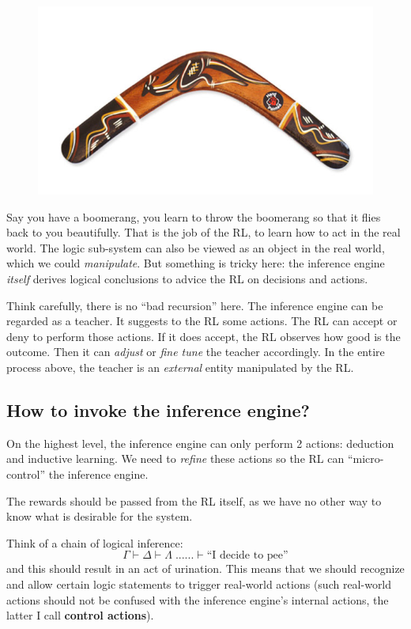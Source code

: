 \documentclass[12pt]{article}
\begin{document}
\begin{figure}[H]
\centering
\includegraphics[scale=0.25]{boomerang.jpg}
\end{figure}

Say you have a boomerang, you learn to throw the boomerang so that it flies back to you beautifully.  That is the job of the RL, to learn how to act in the real world.  The logic sub-system can also be viewed as an object in the real world, which we could \textit{manipulate}.  But something is tricky here: the inference engine \textit{itself} derives logical conclusions to advice the RL on decisions and actions.

Think carefully, there is no ``bad recursion'' here.  The inference engine can be regarded as a teacher.  It suggests to the RL some actions.  The RL can accept or deny to perform those actions.  If it does accept, the RL observes how good is the outcome.  Then it can \textit{adjust} or \textit{fine tune} the teacher accordingly.  In the entire process above, the teacher is an \textit{external} entity manipulated by the RL.

\subsection{How to invoke the inference engine?}

On the highest level, the inference engine can only perform 2 actions:  deduction and inductive learning.  We need to \textit{refine} these actions so the RL can ``micro-control'' the inference engine.

The rewards should be passed from the RL itself, as we have no other way to know what is desirable for the system.

Think of a chain of logical inference:
$$ \Gamma \vdash \Delta \vdash \Lambda \; ... ... \vdash \mbox{``I decide to pee''} $$
and this should result in an act of urination.  This means that we should recognize and allow certain logic statements to trigger real-world actions (such real-world actions should not be confused with the inference engine's internal actions, the latter I call \textbf{control actions}).
\end{document}
